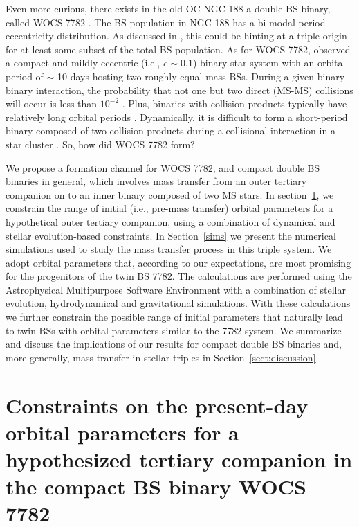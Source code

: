\documentclass[twocolumn]{aastex62}
\begin{document}
Even more curious, there exists in the old OC NGC 188 a
double BS binary, called WOCS 7782 \citep{geller08}.  The BS
population in NGC 188 has a bi-modal period-eccentricity distribution.
As discussed in \citet{2011MNRAS.410.2370L}, this could be hinting at
a triple origin for at least some subset of the total BS population.
As for WOCS 7782, \citet{2009Natur.462.1032M} observed a compact and
mildly eccentric (i.e., $e \sim 0.1$) binary star system with an
orbital period of $\sim$ 10 days hosting two roughly equal-mass BSs.  During a given binary-binary interaction, the probability
that not one but two direct (MS-MS) collisions will occur is less than
$10^{-2}$
\citep{1989AJ.....98..217L,2011MNRAS.410.2370L,2012MNRAS.425.2369L}.
Plus, binaries with collision products typically have relatively long
orbital periods \cite{2011Sci...334.1380F}. Dynamically, it is
difficult to form a short-period binary composed of two collision
products during a collisional interaction in a star cluster
\citep{2011MNRAS.410.2370L,2011Sci...334.1380F}.  So, how did WOCS 7782 form?

We propose a formation channel for WOCS 7782, and compact double BS
binaries in general, which involves mass transfer from an outer
tertiary companion on to an inner binary composed of two MS stars.  In
section~\ref{sect:dyn}, we constrain the range of initial (i.e.,
pre-mass transfer) orbital parameters for a hypothetical outer
tertiary companion, using a combination of dynamical and stellar
evolution-based constraints.  In Section~\ref{sims} we present the
numerical simulations used to study the mass transfer process in this
triple system. We adopt orbital parameters that, according to our
expectations, are most promising for the progenitors of the twin BS
7782.  The calculations are performed using the Astrophysical
Multipurpose Software Environment \cite[\texttt{AMUSE} for short,
  see][]{PortegiesZwart2013456,AMUSE} with a combination of stellar
evolution, hydrodynamical and gravitational simulations.  With these
calculations we further constrain the possible range of initial
parameters that naturally lead to twin BSs with orbital parameters
similar to the 7782 system.  We summarize and discuss the implications
of our results for compact double BS binaries and, more generally,
mass transfer in stellar triples in Section~\ref{sect:discussion}.

\section{Constraints on the present-day orbital parameters for a hypothesized
         tertiary companion in the compact BS binary WOCS 7782} \label{sect:dyn}
\end{document}
